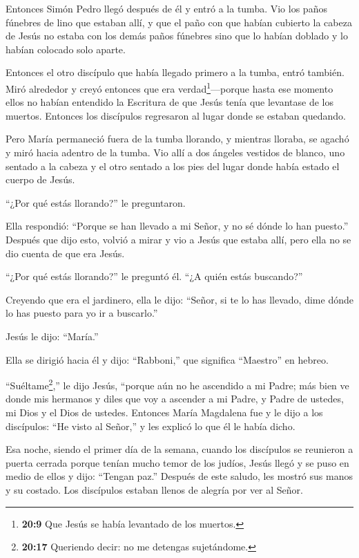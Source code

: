  Entonces Simón Pedro llegó después de él y entró a la
tumba. Vio los paños fúnebres de lino que estaban allí,  y
que el paño con que habían cubierto la cabeza de Jesús no estaba con los
demás paños fúnebres sino que lo habían doblado y lo habían colocado
solo aparte.

 Entonces el otro discípulo que había llegado primero a la
tumba, entró también.  Miró alrededor y creyó entonces que
era verdad\footnote{\textbf{20:9} Que Jesús se había levantado de los
  muertos.}---porque hasta ese momento ellos no habían entendido la
Escritura de que Jesús tenía que levantase de los muertos. 
Entonces los discípulos regresaron al lugar donde se estaban quedando.

 Pero María permaneció fuera de la tumba llorando, y
mientras lloraba, se agachó y miró hacia adentro de la tumba.
 Vio allí a dos ángeles vestidos de blanco, uno sentado a
la cabeza y el otro sentado a los pies del lugar donde había estado el
cuerpo de Jesús.

 ``¿Por qué estás llorando?'' le preguntaron.

Ella respondió: ``Porque se han llevado a mi Señor, y no sé dónde lo han
puesto.''  Después que dijo esto, volvió a mirar y vio a
Jesús que estaba allí, pero ella no se dio cuenta de que era Jesús.

 ``¿Por qué estás llorando?'' le preguntó él. ``¿A quién
estás buscando?''

Creyendo que era el jardinero, ella le dijo: ``Señor, si te lo has
llevado, dime dónde lo has puesto para yo ir a buscarlo.''

 Jesús le dijo: ``María.''

Ella se dirigió hacia él y dijo: ``Rabboni,'' que significa ``Maestro''
en hebreo.

 ``Suéltame\footnote{\textbf{20:17} Queriendo decir: no me
  detengas sujetándome.},'' le dijo Jesús, ``porque aún no he ascendido
a mi Padre; más bien ve donde mis hermanos y diles que voy a ascender a
mi Padre, y Padre de ustedes, mi Dios y el Dios de ustedes.
 Entonces María Magdalena fue y le dijo a los discípulos:
``He visto al Señor,'' y les explicó lo que él le había dicho.

 Esa noche, siendo el primer día de la semana, cuando los
discípulos se reunieron a puerta cerrada porque tenían mucho temor de
los judíos, Jesús llegó y se puso en medio de ellos y dijo: ``Tengan
paz.''  Después de este saludo, les mostró sus manos y su
costado. Los discípulos estaban llenos de alegría por ver al Señor.

